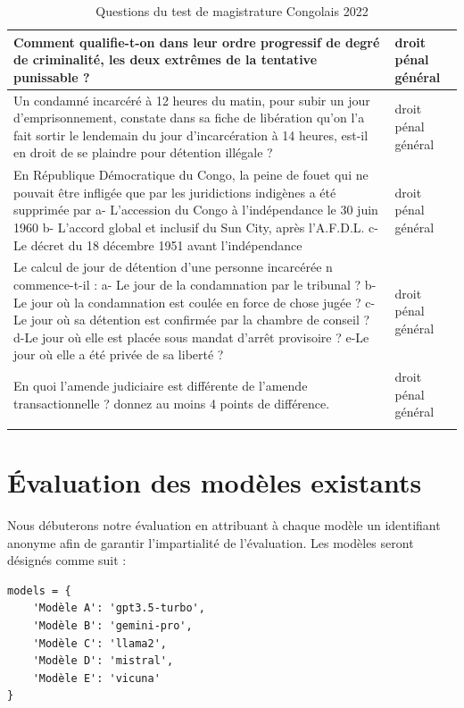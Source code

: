 \begin{longtable}{|p{}|p{}|}
\hline
Comment qualifie-t-on dans leur ordre progressif de degré de criminalité, les deux extrêmes de la tentative punissable ? & droit pénal général \\
\hline
Un condamné incarcéré à 12 heures du matin, pour subir un jour d'emprisonnement, constate dans sa fiche de libération qu'on l'a fait sortir le lendemain du jour d'incarcération à 14 heures, est-il en droit de se plaindre pour détention illégale ? & droit pénal général \\
\hline
En République Démocratique du Congo, la peine de fouet qui ne pouvait être infligée que par les juridictions indigènes a été supprimée par a- L'accession du Congo à l'indépendance le 30 juin 1960 b- L'accord global et inclusif du Sun City, après l'A.F.D.L. c- Le décret du 18 décembre 1951 avant l'indépendance & droit pénal général \\
\hline
Le calcul de jour de détention d'une personne incarcérée n commence-t-il : 
a- Le jour de la condamnation par le tribunal ? 
b-Le jour où la condamnation est coulée en force de chose jugée ? 
c- Le jour où sa détention est confirmée par la chambre de conseil ? 
d-Le jour où elle est placée sous mandat d'arrêt provisoire ? 
e-Le jour où elle a été privée de sa liberté ? & droit pénal général \\
\hline
En quoi l'amende judiciaire est différente de l'amende transactionnelle ? donnez au moins 4 points de différence. & droit pénal général \\
\hline

\caption{Questions du test de magistrature Congolais 2022}
\label{table:magisture-test-2022}
\end{longtable}

\newpage
\section{Évaluation des modèles existants}

Nous débuterons notre évaluation en attribuant à chaque modèle un identifiant anonyme afin de garantir l'impartialité de l'évaluation. Les modèles seront désignés comme suit : 

\begin{listing}[!ht]
\begin{verbatim}
models = {
    'Modèle A': 'gpt3.5-turbo',
    'Modèle B': 'gemini-pro',
    'Modèle C': 'llama2',
    'Modèle D': 'mistral',
    'Modèle E': 'vicuna'
}
\end{verbatim}
\label{appendix:code:python:models}
\end{listing}

